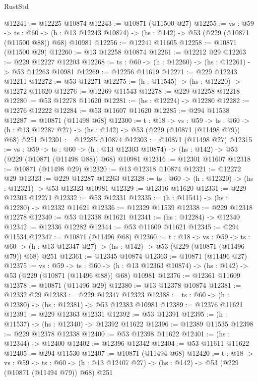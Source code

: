 \begin{lexlean}{RustStd}
\begin{coremodule}
@12241 := @12225 @10874
@12243 := @10871 (@11500 @27)
@12255 := {vs : @59} ->
  {ts : @60} ->
  (h : @13 @12243 @10874) -> (hs : @142) -> @53 (@229 (@10871 (@11500 @88)) @68) @10981
@12256 := @12241 @11605
@12258 := @10871 (@11500 @29)
@12260 := @13 @12258 @10874
@12261 := @12212 @29
@12263 := @229 @12227 @12203
@12268 := {ts : @60} -> (h : @12260) -> (hs : @12261) -> @53 @12263 @10981
@12269 := @12256 @11619
@12271 := @229 @12243 @12211
@12272 := @53 @12271
@12275 := (h : @11545) -> (hs : @12220) -> @12272 @11620
@12276 := @12269 @11543
@12278 := @229 @12258 @12218
@12280 := @53 @12278 @11620
@12281 := (hs : @12224) -> @12280
@12282 := @12276 @12222
@12284 := @53 @11607 @11620
@12285 := @294 @11538
@12287 := @10871 (@11498 @68)
@12300 := {t : @18} ->
  {vs : @59} ->
  {ts : @60} -> (h : @13 @12287 @27) -> (hs : @142) -> @53 (@229 (@10871 (@11498 @79)) @68) @251
@12301 := @12285 @10874
@12303 := @10871 (@11498 @27)
@12315 := {vs : @59} ->
  {ts : @60} ->
  (h : @13 @12303 @10874) -> (hs : @142) -> @53 (@229 (@10871 (@11498 @88)) @68) @10981
@12316 := @12301 @11607
@12318 := @10871 (@11498 @29)
@12320 := @13 @12318 @10874
@12321 := @12272 @29
@12323 := @229 @12287 @12263
@12328 := {ts : @60} -> (h : @12320) -> (hs : @12321) -> @53 @12323 @10981
@12329 := @12316 @11620
@12331 := @229 @12303 @12271
@12332 := @53 @12331
@12335 := (h : @11541) -> (hs : @12280) -> @12332 @11621
@12336 := @12329 @11539
@12338 := @229 @12318 @12278
@12340 := @53 @12338 @11621
@12341 := (hs : @12284) -> @12340
@12342 := @12336 @12282
@12344 := @53 @11609 @11621
@12345 := @294 @11534
@12347 := @10871 (@11496 @68)
@12360 := {t : @18} ->
  {vs : @59} ->
  {ts : @60} -> (h : @13 @12347 @27) -> (hs : @142) -> @53 (@229 (@10871 (@11496 @79)) @68) @251
@12361 := @12345 @10874
@12363 := @10871 (@11496 @27)
@12375 := {vs : @59} ->
  {ts : @60} ->
  (h : @13 @12363 @10874) -> (hs : @142) -> @53 (@229 (@10871 (@11496 @88)) @68) @10981
@12376 := @12361 @11609
@12378 := @10871 (@11496 @29)
@12380 := @13 @12378 @10874
@12381 := @12332 @29
@12383 := @229 @12347 @12323
@12388 := {ts : @60} -> (h : @12380) -> (hs : @12381) -> @53 @12383 @10981
@12389 := @12376 @11621
@12391 := @229 @12363 @12331
@12392 := @53 @12391
@12395 := (h : @11537) -> (hs : @12340) -> @12392 @11622
@12396 := @12389 @11535
@12398 := @229 @12378 @12338
@12400 := @53 @12398 @11622
@12401 := (hs : @12344) -> @12400
@12402 := @12396 @12342
@12404 := @53 @11611 @11622
@12405 := @294 @11530
@12407 := @10871 (@11494 @68)
@12420 := {t : @18} ->
  {vs : @59} ->
  {ts : @60} -> (h : @13 @12407 @27) -> (hs : @142) -> @53 (@229 (@10871 (@11494 @79)) @68) @251

\end{coremodule}
\end{lexlean}
